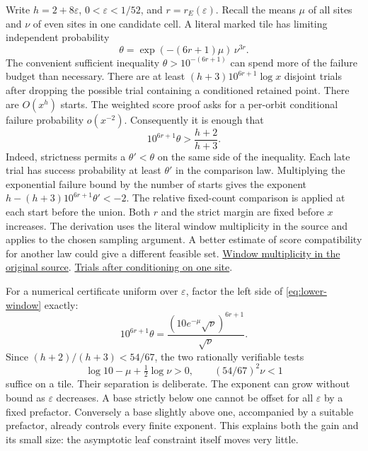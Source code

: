 Write \(h=2+8\varepsilon\), \(0<\varepsilon<1/52\), and \(r=r_E(\varepsilon)\). Recall the means \(\mu\) of all sites and \(\nu\) of even sites in one candidate cell. A literal marked tile has limiting independent probability
\[
        \theta=\exp(-(6r+1)\mu)\,\nu^{3r}.
\]
The convenient sufficient inequality \(\theta>10^{-(6r+1)}\) can spend more of the failure budget than necessary. There are at least \((h+3)10^{6r+1}\log x\) disjoint trials after dropping the possible trial containing a conditioned retained point. There are \(O(x^h)\) starts. The weighted score proof asks for a per-orbit conditional failure probability \(o(x^{-2})\). Consequently it is enough that
\begin{equation}
       10^{6r+1}\theta > \frac{h+2}{h+3}.
       \label{eq:lower-window}
\end{equation}
Indeed, strictness permits a \(\theta'<\theta\) on the same side of the inequality. Each late trial has success probability at least \(\theta'\) in the comparison law. Multiplying the exponential failure bound by the number of starts gives the exponent \(h-(h+3)10^{6r+1}\theta'<-2\). The relative fixed-count comparison is applied at each start before the union. Both \(r\) and the strict margin are fixed before \(x\) increases. The derivation uses the literal window multiplicity in the source and applies to the chosen sampling argument. A better estimate of score compatibility for another law could give a different feasible set.
\href{https://github.com/nousentllc/riemann-hypothesis/blob/40e56bab026552e089d7afcfeff08d2defb9c005/src/Formalism/SharpRestriction/GrowthBounds/UnramifiedQuadraticSetting.lean#L239-L251}{Window multiplicity in the original source}.
\href{https://github.com/nousentllc/riemann-hypothesis/blob/40e56bab026552e089d7afcfeff08d2defb9c005/src/Development/AutomorphicArithmetic/ThickFrames/TilesLe.lean#L43-L67}{Trials after conditioning on one site}.

For a numerical certificate uniform over \(\varepsilon\), factor the left side of \eqref{eq:lower-window} exactly:
\[
       10^{6r+1}\theta
       =\frac{(10e^{-\mu}\sqrt{\nu})^{6r+1}}{\sqrt{\nu}} .
\]
Since \((h+2)/(h+3)<54/67\), the two rationally verifiable tests
\[
    \log 10-\mu+\tfrac12\log\nu>0,
    \qquad (54/67)^2\nu<1
\]
suffice on a tile. Their separation is deliberate. The exponent can grow without bound as \(\varepsilon\) decreases. A base strictly below one cannot be offset for all \(\varepsilon\) by a fixed prefactor. Conversely a base slightly above one, accompanied by a suitable prefactor, already controls every finite exponent. This explains both the gain and its small size: the asymptotic leaf constraint itself moves very little.

